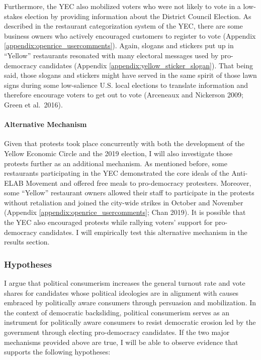\documentclass[letterpaper, 12pt]{article}
\begin{document}
Furthermore, the YEC also mobilized voters who were not likely to vote in a low-stakes election by providing information about the District Council Election. As described in the restaurant categorization system of the YEC, there are some business owners who actively encouraged customers to register to vote (Appendix \ref{appendix:openrice_usercomments}). Again, slogans and stickers put up in ``Yellow'' restaurants resonated with many electoral messages used by pro-democracy candidates (Appendix \ref{appendix:yellow_sticker_slogan}). That being said, those slogans and stickers might have served in the same spirit of those lawn signs during some low-salience U.S. local elections to translate information and therefore encourage voters to get out to vote (Arceneaux and Nickerson 2009;  Green et al.\ 2016). 

\paragraph*{Alternative Mechanism} \label{section:alternative_mechanism}
Given that protests took place concurrently with both the development of the Yellow Economic Circle and the 2019 election, I will also investigate those protests further as an additional mechanism. As mentioned before, some restaurants participating in the YEC demonstrated the core ideals of the Anti-ELAB Movement and offered free meals to pro-democracy protesters. Moreover, some ``Yellow'' restaurant owners allowed their staff to participate in the protests without retaliation and joined the city-wide strikes in October and November (Appendix \ref{appendix:openrice_usercomments}; Chan 2019). It is possible that the YEC also encouraged protests while rallying voters' support for pro-democracy candidates. I will empirically test this alternative mechanism in the results section.


\subsubsection{Hypotheses}
I argue that political consumerism increases the general turnout rate and vote shares for candidates whose political ideologies are in alignment with causes embraced by politically aware consumers through persuasion and mobilization. In the context of democratic backsliding, political consumerism serves as an instrument for politically aware consumers to resist democratic erosion led by the government through electing pro-democracy candidates. If the two major mechanisms provided above are true, I will be able to observe evidence that supports the following hypotheses: 
\end{document}
